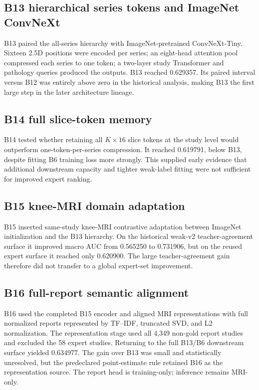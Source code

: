 \documentclass[preprint,12pt]{elsarticle}
\begin{document}
\subsection{B13 hierarchical series tokens and ImageNet ConvNeXt}
B13 paired the all-series hierarchy with ImageNet-pretrained ConvNeXt-Tiny. Sixteen 2.5D positions were encoded per series; an eight-head attention pool compressed each series to one token; a two-layer study Transformer and pathology queries produced the outputs. B13 reached 0.629357. Its paired interval versus B12 was entirely above zero in the historical analysis, making B13 the first large step in the later architecture lineage.

\subsection{B14 full slice-token memory}
B14 tested whether retaining all $K\times16$ slice tokens at the study level would outperform one-token-per-series compression. It reached 0.619791, below B13, despite fitting B6 training loss more strongly. This supplied early evidence that additional downstream capacity and tighter weak-label fitting were not sufficient for improved expert ranking.

\subsection{B15 knee-MRI domain adaptation}
B15 inserted same-study knee-MRI contrastive adaptation between ImageNet initialization and the B13 hierarchy. On the historical weak-v2 teacher-agreement surface it improved macro AUC from 0.565250 to 0.731906, but on the reused expert surface it reached only 0.620900. The large teacher-agreement gain therefore did not transfer to a global expert-set improvement.

\subsection{B16 full-report semantic alignment}
B16 used the completed B15 encoder and aligned MRI representations with full normalized reports represented by TF--IDF, truncated SVD, and L2 normalization. The representation stage used all 4,349 non-gold report studies and excluded the 58 expert studies. Returning to the full B13/B6 downstream surface yielded 0.634977. The gain over B13 was small and statistically unresolved, but the predeclared point-estimate rule retained B16 as the representation source. The report head is training-only; inference remains MRI-only.
\end{document}
